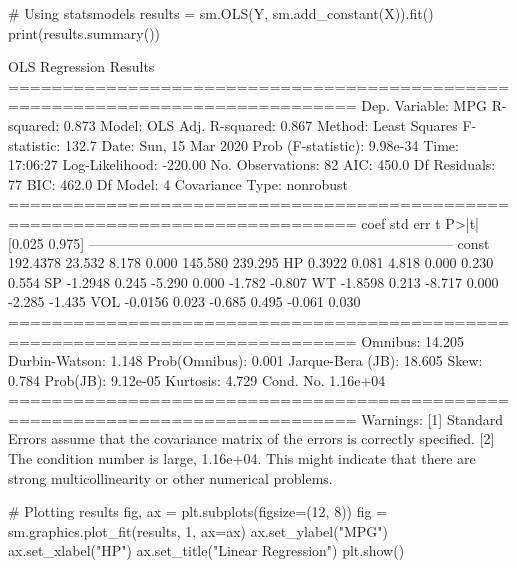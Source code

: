 \begin{python}
# Using statsmodels
results = sm.OLS(Y, sm.add_constant(X)).fit()
print(results.summary())
\end{python}
\begin{console}
                            OLS Regression Results
==============================================================================
Dep. Variable:                    MPG   R-squared:                       0.873
Model:                            OLS   Adj. R-squared:                  0.867
Method:                 Least Squares   F-statistic:                     132.7
Date:                Sun, 15 Mar 2020   Prob (F-statistic):           9.98e-34
Time:                        17:06:27   Log-Likelihood:                -220.00
No. Observations:                  82   AIC:                             450.0
Df Residuals:                      77   BIC:                             462.0
Df Model:                           4
Covariance Type:            nonrobust
==============================================================================
                 coef    std err          t      P>|t|      [0.025      0.975]
------------------------------------------------------------------------------
const        192.4378     23.532      8.178      0.000     145.580     239.295
HP             0.3922      0.081      4.818      0.000       0.230       0.554
SP            -1.2948      0.245     -5.290      0.000      -1.782      -0.807
WT            -1.8598      0.213     -8.717      0.000      -2.285      -1.435
VOL           -0.0156      0.023     -0.685      0.495      -0.061       0.030
==============================================================================
Omnibus:                       14.205   Durbin-Watson:                   1.148
Prob(Omnibus):                  0.001   Jarque-Bera (JB):               18.605
Skew:                           0.784   Prob(JB):                     9.12e-05
Kurtosis:                       4.729   Cond. No.                     1.16e+04
==============================================================================
Warnings:
[1] Standard Errors assume that the covariance matrix of the errors is correctly
specified.
[2] The condition number is large, 1.16e+04. This might indicate that there are
strong multicollinearity or other numerical problems.
\end{console}

\begin{python}
# Plotting results
fig, ax = plt.subplots(figsize=(12, 8))
fig = sm.graphics.plot_fit(results, 1, ax=ax)
ax.set_ylabel("MPG")
ax.set_xlabel("HP")
ax.set_title("Linear Regression")
plt.show()
\end{python}

